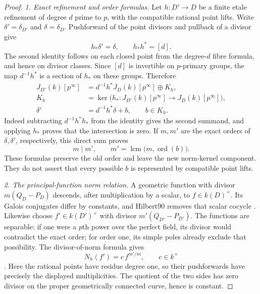 \documentclass[11pt,a4paper]{article}
\begin{document}
\begin{proof}
\emph{1. Exact refinement and order formulas.}
Let $h:D'\to D$ be a finite etale refinement of degree $d$
prime to $p$, with the compatible rational point lifts.
Write $\delta'=\delta_{D'}$ and $\delta=\delta_D$.
Pushforward of the point divisors and pullback of a divisor
give
\[
                     h_*\delta'=\delta,
                     \qquad h_*h^*=[d].
       \tag{NC.2}
\]
The second identity follows on each closed point from the
degree-$d$ fibre formula, and hence on divisor classes.
Since $[d]$ is invertible on $p$-primary groups, the map
$d^{-1}h^*$ is a section of $h_*$ on these groups. Therefore
\[
\begin{aligned}
 J_{D'}(k)[p^\infty]
   &=d^{-1}h^*J_D(k)[p^\infty]\oplus K_h,\\
 K_h&=\ker\bigl(h_*:J_{D'}(k)[p^\infty]
                         \longrightarrow J_D(k)[p^\infty]\bigr),\\
 \delta'&=d^{-1}h^*\delta+b,\qquad b\in K_h.
\end{aligned}
       \tag{NC.3}
\]
Indeed subtracting $d^{-1}h^*h_*$ from the identity gives
the second summand, and applying $h_*$ proves that the
intersection is zero. If $m,m'$ are the exact orders of
$\delta,\delta'$, respectively, this direct sum proves
\[
           m\mid m',\qquad
           m'=\operatorname{lcm}\bigl(m,\operatorname{ord}(b)\bigr).
       \tag{NC.4}
\]
These formulas preserve the old order and leave the new
norm-kernel component. They do not assert that every possible
$b$ is represented by compatible point lifts.

\emph{2. The principal-function norm relation.}
A geometric function with divisor $m(Q_D-P_D)$ descends,
after multiplication by a scalar, to $f\in k(D)^\times$.
Its Galois conjugates differ by constants, and Hilbert90
removes that scalar cocycle
\cite[Theorem~59.24.1, Tag~\texttt{03P8}]{Stacks03P8}.
Likewise choose $f'\in k(D')^\times$ with divisor
$m'(Q_{D'}-P_{D'})$.
The functions are separable: if one were a $p$th power over
the perfect field, its divisor would contradict the exact
order; for order one, its simple poles already exclude that
possibility. The divisor-of-norm formula gives
\[
                 N_h(f')=c\,f^{m'/m},\qquad c\in k^\times
       \tag{NC.5}
\]
\cite[Lemma~42.18.1, Tag~\texttt{02RT}]{Stacks02RT}.
Here the rational points have residue degree one, so their
pushforwards have precisely the displayed multiplicities.
The quotient of the two sides has zero divisor on the
proper geometrically connected curve, hence is constant.


\end{proof}
\end{document}
